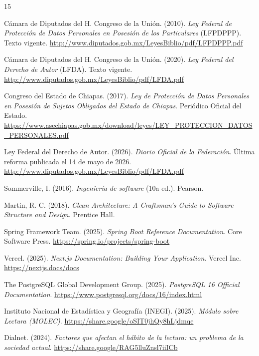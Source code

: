 \documentclass[12pt, atypical, journal]{article}
\begin{document}
\begin{thebibliography}{15}

Cámara de Diputados del H. Congreso de la Unión. (2010). \textit{Ley Federal de Protección de Datos Personales en Posesión de los Particulares} (LFPDPPP). Texto vigente. \url{http://www.diputados.gob.mx/LeyesBiblio/pdf/LFPDPPP.pdf}

Cámara de Diputados del H. Congreso de la Unión. (2020). \textit{Ley Federal del Derecho de Autor} (LFDA). Texto vigente. \url{http://www.diputados.gob.mx/LeyesBiblio/pdf/LFDA.pdf}

Congreso del Estado de Chiapas. (2017). \textit{Ley de Protección de Datos Personales en Posesión de Sujetos Obligados del Estado de Chiapas}. Periódico Oficial del Estado. \url{https://www.asechiapas.gob.mx/download/leyes/LEY_PROTECCION_DATOS_PERSONALES.pdf}

Ley Federal del Derecho de Autor. (2026). \textit{Diario Oficial de la Federación}. Última reforma publicada el 14 de mayo de 2026. \url{http://www.diputados.gob.mx/LeyesBiblio/pdf/LFDA.pdf}

Sommerville, I. (2016). \textit{Ingeniería de software} (10a ed.). Pearson.

Martin, R. C. (2018). \textit{Clean Architecture: A Craftsman's Guide to Software Structure and Design}. Prentice Hall.

Spring Framework Team. (2025). \textit{Spring Boot Reference Documentation}. Core Software Press. \url{https://spring.io/projects/spring-boot}

Vercel. (2025). \textit{Next.js Documentation: Building Your Application}. Vercel Inc. \url{https://nextjs.docs/docs}

The PostgreSQL Global Development Group. (2025). \textit{PostgreSQL 16 Official Documentation}. \url{https://www.postgresql.org/docs/16/index.html}

Instituto Nacional de Estadística y Geografía (INEGI). (2025). \textit{Módulo sobre Lectura (MOLEC)}. \url{https://share.google/oSIT0jhQy8hLjdmqe}

Dialnet. (2024). \textit{Factores que afectan el hábito de la lectura: un problema de la sociedad actual}. \url{https://share.google/RAG5lluZnsl7iiICb}


\end{thebibliography}
\end{document}
